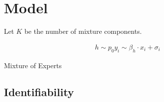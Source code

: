 \section{Model}
\label{sec:model}

Let $K$ be the number of mixture components.

\begin{align}
h \sim p_0
y_i \sim \beta_h \cdot x_i + \sigma_i
\end{align}

Mixture of Experts

\subsection{Identifiability}

